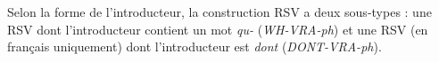 													

\z

Selon la forme de l’introducteur, la construction RSV a deux sous-types : une RSV dont l’introducteur contient un mot \textit{qu-} (\textit{WH-VRA-ph}) et une RSV (en français uniquement) dont l’introducteur est \textit{dont} (\textit{DONT-VRA-ph}).

